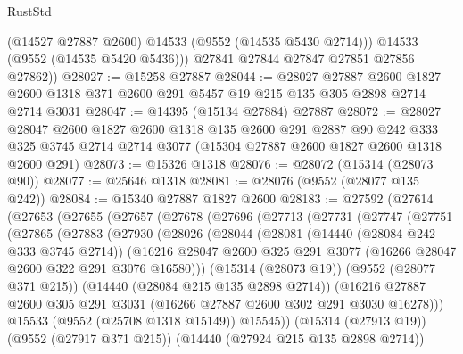 \begin{lexlean}{RustStd}
\begin{coremodule}
            (@14527 @27887 @2600)
            @14533
            (@9552 (@14535 @5430 @2714)))
          @14533
          (@9552 (@14535 @5420 @5436)))
        @27841
        @27844
        @27847
        @27851
        @27856
        @27862))
@28027 := @15258 @27887
@28044 := @28027
    @27887
    @2600
    @1827
    @2600
    @1318
    @371
    @2600
    @291
    @5457
    @19
    @215
    @135
    @305
    @2898
    @2714
    @2714
    @3031
@28047 := @14395 (@15134 @27884) @27887
@28072 := @28027
    @28047
    @2600
    @1827
    @2600
    @1318
    @135
    @2600
    @291
    @2887
    @90
    @242
    @333
    @325
    @3745
    @2714
    @2714
    @3077
    (@15304 @27887 @2600 @1827 @2600 @1318 @2600 @291)
@28073 := @15326 @1318
@28076 := @28072 (@15314 (@28073 @90))
@28077 := @25646 @1318
@28081 := @28076 (@9552 (@28077 @135 @242))
@28084 := @15340 @27887 @1827 @2600
@28183 := @27592
    (@27614
      (@27653
        (@27655
          (@27657
            (@27678
              (@27696
                (@27713
                  (@27731
                    (@27747
                      (@27751
                        (@27865
                          (@27883
                            (@27930
                              (@28026
                                (@28044
                                  (@28081
                                    (@14440 (@28084 @242 @333 @3745 @2714))
                                    (@16216
                                      @28047
                                      @2600
                                      @325
                                      @291
                                      @3077
                                      (@16266 @28047 @2600 @322 @291 @3076 @16580)))
                                  (@15314 (@28073 @19))
                                  (@9552 (@28077 @371 @215))
                                  (@14440 (@28084 @215 @135 @2898 @2714))
                                  (@16216
                                    @27887
                                    @2600
                                    @305
                                    @291
                                    @3031
                                    (@16266 @27887 @2600 @302 @291 @3030 @16278)))
                                @15533
                                (@9552 (@25708 @1318 @15149))
                                @15545))
                            (@15314 (@27913 @19))
                            (@9552 (@27917 @371 @215))
                            (@14440 (@27924 @215 @135 @2898 @2714))

\end{coremodule}
\end{lexlean}
